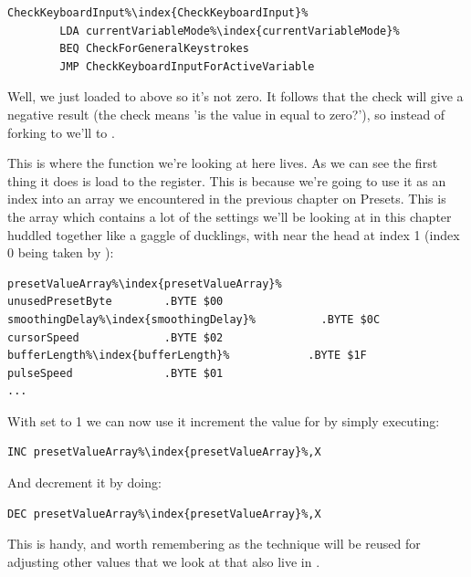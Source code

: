 \begin{lstlisting}[escapechar=\%]
CheckKeyboardInput%\index{CheckKeyboardInput}%   
        LDA currentVariableMode%\index{currentVariableMode}%
        BEQ CheckForGeneralKeystrokes
        JMP CheckKeyboardInputForActiveVariable
\end{lstlisting}

Well, we just loaded  to  above so it's not zero.  It follows that
the  check will give a negative result (the check means 'is the value in  equal to zero?'), 
so instead of forking to  we'll  to .

This is where the function we're looking at here lives. As we can see the first thing it does is load 
 to the  register. This is because we're going to use it as an index
into an array we encountered in the previous chapter on Presets. This is the array 
which contains a lot of the settings we'll be looking at in this chapter huddled together like a gaggle
of ducklings, with  near the head at index 1 (index 0 being taken by ):

\begin{lstlisting}[escapechar=\%]
presetValueArray%\index{presetValueArray}%
unusedPresetByte        .BYTE $00
smoothingDelay%\index{smoothingDelay}%          .BYTE $0C
cursorSpeed             .BYTE $02
bufferLength%\index{bufferLength}%            .BYTE $1F
pulseSpeed              .BYTE $01
...
\end{lstlisting}

With  set to 1 we can now use it increment the value for  by
simply executing:
\begin{lstlisting}[escapechar=\%]
        INC presetValueArray%\index{presetValueArray}%,X
\end{lstlisting}
And decrement it by doing:
\begin{lstlisting}[escapechar=\%]
        DEC presetValueArray%\index{presetValueArray}%,X
\end{lstlisting}
This is handy, and worth remembering as the technique will be reused for adjusting other values that 
we look at that also live in .

